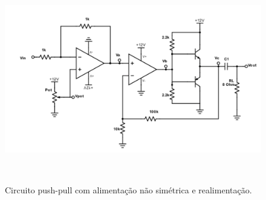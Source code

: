 \documentclass{article}
\begin{document}
    \nocite{*}
    
    

    \begin{figure}[!h]
        \centering
        \includegraphics[height=9cm]{circ1.png}
        \caption{Circuito push-pull com alimentação não simétrica e realimentação.}
        \label{fig:circ1}
    \end{figure}
    
    
\end{document}
